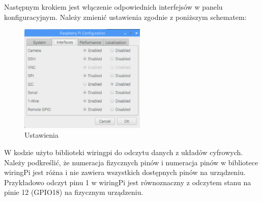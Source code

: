 Następnym krokiem jest włączenie odpowiednich interfejsów w panelu konfiguracyjnym. Należy zmienić ustawienia zgodnie z poniższym schematem:
\begin{figure}[h]
	\centering
	\includegraphics[width=6cm]{RSettings}
	\caption{Ustawienia}
\end{figure}
W kodzie użyto biblioteki wiringpi do odczytu danych z układów cyfrowych. Należy podkreślić, że numeracja fizycznych pinów i numeracja pinów w bibliotece wiringPi jest różna i nie zawiera wszystkich dostępnych pinów na urządzeniu. Przykładowo odczyt pinu 1 w wiringPi jest równoznaczny z odczytem stanu na pinie 12 (GPIO18) na fizycznym urządzeniu.
